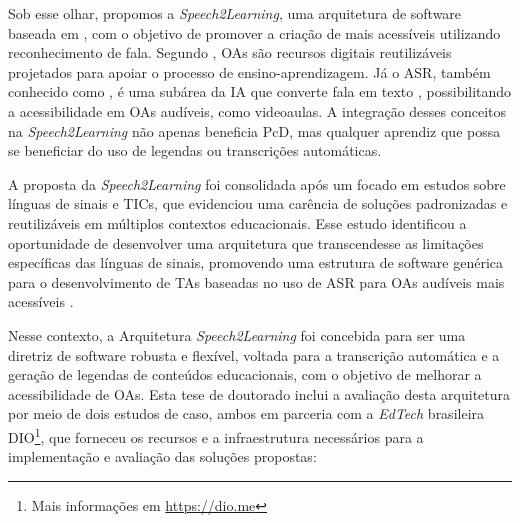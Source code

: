 Sob esse olhar, propomos a \textit{Speech2Learning}, uma arquitetura de software baseada em , com o objetivo de promover a criação de  mais acessíveis utilizando reconhecimento de fala. Segundo , OAs são recursos digitais reutilizáveis projetados para apoiar o processo de ensino-aprendizagem. Já o ASR, também conhecido como , é uma subárea da IA que converte fala em texto \cite{Jurafsky2024}, possibilitando a acessibilidade em OAs audíveis, como videoaulas. A integração desses conceitos na \textit{Speech2Learning} não apenas beneficia PcD, mas qualquer aprendiz que possa se beneficiar do uso de legendas ou transcrições automáticas.

A proposta da \textit{Speech2Learning} foi consolidada após um  focado em estudos sobre línguas de sinais e TICs, que evidenciou uma carência de soluções padronizadas e reutilizáveis em múltiplos contextos educacionais. Esse estudo identificou a oportunidade de desenvolver uma arquitetura que transcendesse as limitações específicas das línguas de sinais, promovendo uma estrutura de software genérica para o desenvolvimento de TAs baseadas no uso de ASR para OAs audíveis mais acessíveis \cite{FalvoJr2020_FIE, FalvoJr2020_SBIE, FalvoJr2021_RENOTE}.

Nesse contexto, a Arquitetura \textit{Speech2Learning} foi concebida para ser uma diretriz de software robusta e flexível, voltada para a transcrição automática e a geração de legendas de conteúdos educacionais, com o objetivo de melhorar a acessibilidade de OAs. Esta tese de doutorado inclui a avaliação desta arquitetura por meio de dois estudos de caso, ambos em parceria com a \textit{EdTech} brasileira DIO\footnote{Mais informações em \url{https://dio.me}}, que forneceu os recursos e a infraestrutura necessários para a implementação e avaliação das soluções propostas:

